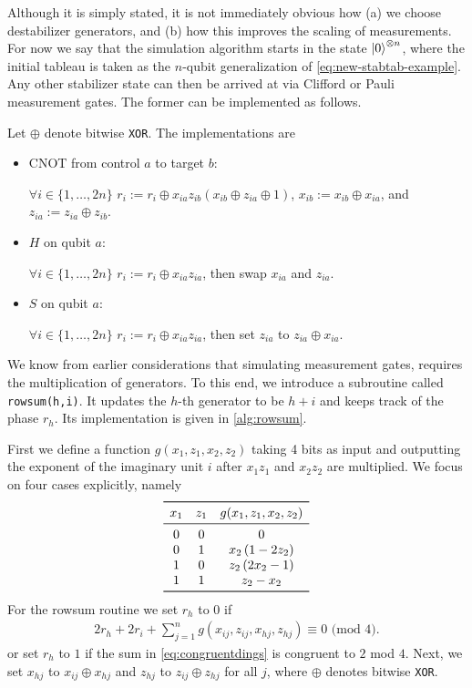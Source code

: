 Although it is simply stated, it is not immediately obvious how (a) we choose
destabilizer generators, and (b) how this improves the scaling of measurements.
For now we say that the simulation algorithm starts in the state
$\ket{0}^{\otimes n}$, where the initial tableau is taken as the $n$-qubit
generalization of \cref{eq:new-stabtab-example}. Any other stabilizer state can
then be arrived at via Clifford or Pauli measurement gates. The former can be
implemented as follows.
\begin{alg}\label{alg:tab-clifford}
  Let $\oplus$ denote bitwise \verb|XOR|. The implementations are
  \begin{itemize}
    \item CNOT from control $a$ to target $b$:

      $\forall i \in \{1,\ldots,2n\}$ $r_i := r_i \oplus x_{ia}z_{ib}\left(
      x_{ib} \oplus z_{ia} \oplus 1 \right)$, $x_{ib} := x_{ib} \oplus x_{ia}$,
      and $z_{ia} := z_{ia}\oplus z_{ib}$.
    \item $H$ on qubit $a$:

      $\forall i \in \{1,\ldots,2n\}$ $r_i := r_i \oplus x_{ia}z_{ia}$, then
      swap $x_{ia}$ and $z_{ia}$.
    \item $S$ on qubit $a$:

      $\forall i \in \{1,\ldots,2n\}$ $r_i := r_i \oplus x_{ia}z_{ia}$, then
      set $z_{ia}$ to $z_{ia} \oplus x_{ia}$.
  \end{itemize}
\end{alg}
We know from earlier considerations that simulating measurement gates,
requires the multiplication of
generators. To this end, we introduce 
a subroutine called \texttt{rowsum(h,i)}.
It updates the $h$-th generator to be $h+i$
and keeps track of the phase $r_h$.
Its implementation is given in \cref{alg:rowsum}.
\begin{alg}[rowsum]\label{alg:rowsum}
  First we define a function $g(x_1, z_1, x_2, z_2)$ taking 4 bits as input and
  outputting the exponent of the imaginary unit $i$ after $x_1 z_1$ and $x_2 z_2$ are multiplied.
  We focus on four cases explicitly, namely
  \[
  \begin{array}{ccc}\toprule
      x_1 & z_1 & g(x_1,z_1,x_2,z_2) \\ \midrule
      0 & 0 & 0 \\
      0 & 1 & x_2\left( 1-2z_2 \right) \\
      1 & 0 & z_2\left( 2x_2-1 \right) \\
      1 & 1 & z_2 - x_2 \\ \bottomrule
  \end{array}
  \]
  For the rowsum routine we set $r_h$ to $0$ if
  \begin{align}\label{eq:congruentdings}
    2r_h + 2r_i + \sum_{j=1}^n g\left(x_{ij},z_{ij},x_{hj},z_{hj}\right) \equiv
    0 \text{ (mod } 4)
  .\end{align}
  or set $r_h$ to $1$ if the sum in \cref{eq:congruentdings} is congruent to
  $2$ mod $4$. Next, we set $x_{hj}$ to $x_{ij}\oplus x_{hj}$ and $z_{hj}$ to $z_{ij}
  \oplus z_{hj}$ for all $j$, where $\oplus$ denotes bitwise \verb|XOR|.
\end{alg}

